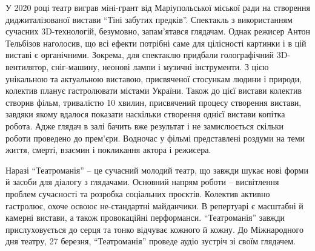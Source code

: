 У 2020 році театр виграв міні-грант від Маріупольської міської ради на
створення диджиталізованої вистави \enquote{Тіні забутих предків}. Спектакль з
використанням сучасних 3D-технологій, безумовно, запам'ятався глядачам. Однак
режисер Антон Тельбізов  наголосив, що всі ефекти потрібні саме для цілісності
картинки і в цій виставі є органічними. Зокрема, для спектаклю придбали
голографічний 3D-вентилятор, сніг-машину, неонові лампи і музичні інструменти.
З цією унікальною та актуальною виставою, присвяченої стосункам людини і
природи, колектив планує гастролювати містами України. Також до цієї вистави
колектив створив фільм, тривалістю 10 хвилин, присвячений процесу створення
вистави, завдяки якому вдалося показати наскільки створення однієї вистави
копітка робота. Адже глядач в залі бачить вже результат і не замислюється
скільки роботи проведено до прем'єри. Водночас у фільмі представлені роздуми на
теми життя, смерті, взаємин і покликання актора і режисера.


Наразі \enquote{Театроманія} – це сучасний молодий театр, що завжди шукає нові форми й
засоби для діалогу з глядачами. Основний напрям роботи – висвітлення проблем
сучасності та розробка соціальних проєктів. Колектив активно гастролює, охоче
освоює не\hyp{}стандартні майданчики. В репертуарі є масштабні й камерні вистави, а
також провокаційні перформанси. \enquote{Театроманія} завжди прислуховується до серця
та тонко відчуває кожного й кожну. До Міжнародного дня театру, 27 березня,
\enquote{Театроманія} проведе аудіо зустріч зі своїм глядачем.

